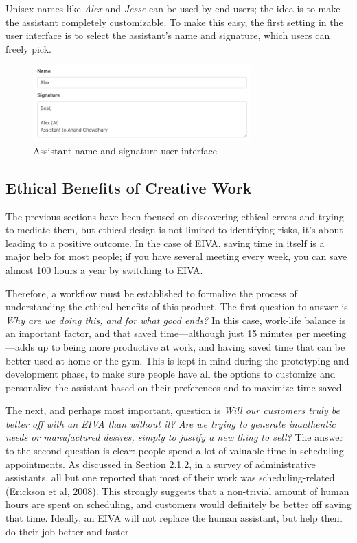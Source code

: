 \documentclass{article}
\begin{document}
Unisex names like \emph{Alex} and \emph{Jesse} can be used by end users; the idea is to make the assistant completely customizable. To make this easy, the first setting in the user interface is to select the assistant's name and signature, which users can freely pick.


\begin{figure}[h]
 \centering
 \includegraphics[width=0.75\textwidth]{name.png}
 \caption{Assistant name and signature user interface}
 \label{fig:checkbox}
\end{figure}

\subsection{Ethical Benefits of Creative Work}

The previous sections have been focused on discovering ethical errors and trying to mediate them, but ethical design is not limited to identifying risks, it's about leading to a positive outcome. In the case of EIVA, saving time in itself is a major help for most people; if you have several meeting every week, you can save almost 100 hours a year by switching to EIVA.

Therefore, a workflow must be established to formalize the process of understanding the ethical benefits of this product. The first question to answer is \emph{Why are we doing this, and for what good ends?} In this case, work-life balance is an important factor, and that saved time---although just 15 minutes per meeting---adds up to being more productive at work, and having saved time that can be better used at home or the gym. This is kept in mind during the prototyping and development phase, to make sure people have all the options to customize and personalize the assistant based on their preferences and to maximize time saved.

The next, and perhaps most important, question is \emph{Will our customers truly be better off with an EIVA than without it? Are we trying to generate inauthentic needs or manufactured desires, simply to justify a new thing to sell?} The answer to the second question is clear: people spend a lot of valuable time in scheduling appointments. As discussed in Section 2.1.2, in a survey of administrative assistants, all but one reported that most of their work was scheduling-related (Erickson et al, 2008). This strongly suggests that a non-trivial amount of human hours are spent on scheduling, and customers would definitely be better off saving that time. Ideally, an EIVA will not replace the human assistant, but help them do their job better and faster.
\end{document}
